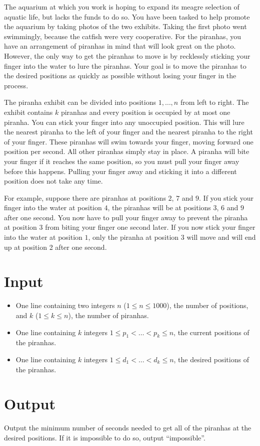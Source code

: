
\providecommand\maxn{}
\renewcommand{\maxn}{1000}


The aquarium at which you work is hoping to expand its meagre selection of aquatic life, but lacks the funds to do so.
You have been tasked to help promote the aquarium by taking photos of the two exhibits.
Taking the first photo went swimmingly, because the catfish were very cooperative.
For the piranhas, you have an arrangement of piranhas in mind that will look great on the photo.
However, the only way to get the piranhas to move is by recklessly sticking your finger into the water to lure the piranhas.
Your goal is to move the piranhas to the desired positions as quickly as possible without losing your finger in the process.

The piranha exhibit can be divided into positions $1,\ldots,n$ from left to right.
The exhibit contains $k$ piranhas and every position is occupied by at most one piranha.
You can stick your finger into any unoccupied position.
This will lure the nearest piranha to the left of your finger and the nearest piranha to the right of your finger.
These piranhas will swim towards your finger, moving forward one position per second.
All other piranhas simply stay in place.
A piranha will bite your finger if it reaches the same position, so you must pull your finger away before this happens.
Pulling your finger away and sticking it into a different position does not take any time.

For example, suppose there are piranhas at positions $2$, $7$ and $9$.
If you stick your finger into the water at position $4$, the piranhas will be at positions $3$, $6$ and $9$ after one second.
You now have to pull your finger away to prevent the piranha at position $3$ from biting your finger one second later.
If you now stick your finger into the water at position $1$, only the piranha at position $3$ will move and will end up at position 2 after one second.

\section*{Input}
	\begin{itemize}
		\item One line containing two integers $n$ ($1\leq n\leq\maxn$), the number of positions,
			and $k$ ($1\leq k\leq n$), the number of piranhas.
		\item One line containing $k$ integers $1\leq p_1<\ldots<p_k\leq n$, the current positions of the piranhas.
		\item One line containing $k$ integers $1\leq d_1<\ldots<d_k\leq n$, the desired positions of the piranhas.
	\end{itemize}

\section*{Output}
	Output the minimum number of seconds needed to get all of the piranhas at the desired positions. If it is impossible to do so, output ``impossible''.
